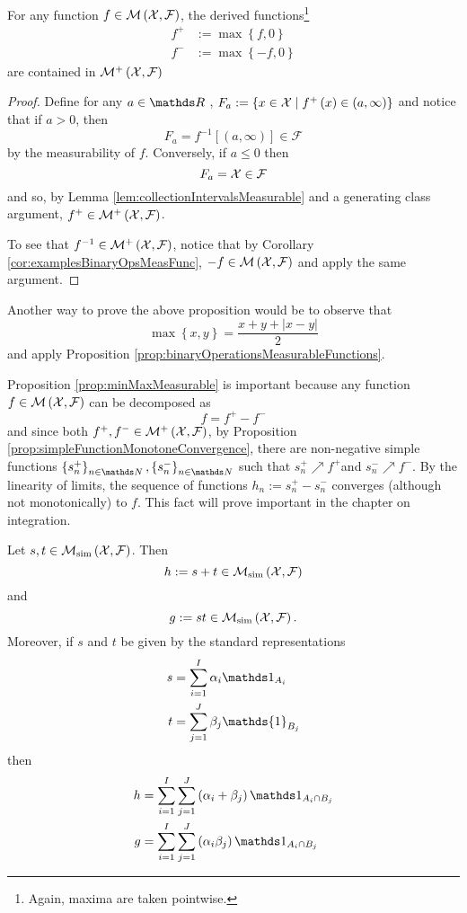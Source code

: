 \begin{prop}
\label{prop:minMaxMeasurable}For any function $f\in\mathcal{M}\left(\mathcal{X},\mathcal{F}\right)$,
the derived functions\footnote{Again, maxima are taken pointwise.}
\begin{align*}
f^{+} & :=\max\left\{ f,0\right\} \\
f^{-} & :=\max\left\{ -f,0\right\} 
\end{align*}
are contained in $\mathcal{M}^{+}\left(\mathcal{X},\mathcal{F}\right)$
\end{prop}

\begin{proof}
Define for any $a\in\R$ , $F_{a}:=\left\{ x\in\mathcal{X}\mid f^{+}\left(x\right)\in\left(a,\infty\right)\right\} $
and notice that if $a>0$, then
\[
F_{a}=f^{-1}\left[\left(a,\infty\right)\right]\in\mathcal{F}
\]
by the measurability of $f.$ Conversely, if $a\leq0$ then
\[
F_{a}=\mathcal{X}\in\mathcal{F}
\]
and so, by Lemma \ref{lem:collectionIntervalsMeasurable} and a generating
class argument, $f^{+}\in\mathcal{M}^{+}\left(\mathcal{X},\mathcal{F}\right)$.

To see that $f^{-1}\in\mathcal{M}^{+}\left(\mathcal{X},\mathcal{F}\right)$,
notice that by Corollary \ref{cor:examplesBinaryOpsMeasFunc}, $-f\in\mathcal{M}\left(\mathcal{X},\mathcal{F}\right)$
and apply the same argument.
\end{proof}
\begin{rem*}
Another way to prove the above proposition would be to observe that
\[
\max\left\{ x,y\right\} =\frac{x+y+\left|x-y\right|}{2}
\]
and apply Proposition \ref{prop:binaryOperationsMeasurableFunctions}.
\end{rem*}
Proposition \ref{prop:minMaxMeasurable} is important because any
function $f\in\mathcal{M}\left(\mathcal{X},\mathcal{F}\right)$ can be decomposed as
\[
f=f^{+}-f^{-}
\]
and since both $f^{+},f^{-}\in\mathcal{M}^{+}\left(\mathcal{X},\mathcal{F}\right)$, by Proposition
\ref{prop:simpleFunctionMonotoneConvergence}, there are non-negative
simple functions $\left\{ s_{n}^{+}\right\} _{n\in\N},\left\{ s_{n}^{-}\right\} _{n\in\N}$
such that $s_{n}^{+}\nearrow f^{+}$and $s_{n}^{-}\nearrow f^{-}$.
By the linearity of limits, the sequence of functions $h_{n}:=s_{n}^{+}-s_{n}^{-}$
converges (although not monotonically) to $f$. This fact will prove
important in the chapter on integration.
\begin{prop}
\label{prop:simpleFunctionsAddMultiply}Let $s,t\in\mathcal{M}_{\textnormal{sim}}\left(\mathcal{X},\mathcal{F}\right)$.
Then
\[
h:=s+t\in\mathcal{M}_{\textnormal{sim}}\left(\mathcal{X},\mathcal{F}\right)
\]
and 
\[
g:=st\in\mathcal{M}_{\textnormal{sim}}\left(\mathcal{X},\mathcal{F}\right).
\]
Moreover, if $s$ and $t$ be given by the standard representations
\begin{align*}
s & =\sum_{i=1}^{I}\alpha_{i}\indicate_{A_{i}}\\
t & =\sum_{j=1}^{J}\beta_{j}\mathds{1}_{B_{j}}
\end{align*}
then
\begin{align*}
h & =\sum_{i=1}^{I}\sum_{j=1}^{J}\left(\alpha_{i}+\beta_{j}\right)\indicate_{A_{i}\cap B_{j}}\\
g & =\sum_{i=1}^{I}\sum_{j=1}^{J}\left(\alpha_{i}\beta_{j}\right)\indicate_{A_{i}\cap B_{j}}
\end{align*}
\end{prop}

